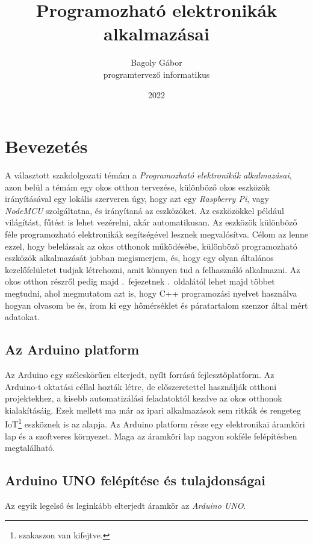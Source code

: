 \documentclass{thesis-ekf}
\theoremstyle{definition}
\begin{document}
\title{Programozható elektronikák alkalmazásai}
\author{Bagoly Gábor\\programtervező informatikus}
\date{2022}
\maketitle
\tableofcontents

\chapter{Bevezetés}\label{ArduinoChapter}

A választott szakdolgozati témám a \emph{Programozható elektronikák alkalmazásai}, azon belül a témám egy okos otthon tervezése, különböző okos eszközök irányításával egy lokális szerveren úgy, hogy azt egy \emph{Raspberry Pi}, vagy \emph{NodeMCU} szolgáltatna, és irányítaná az eszközöket.
Az eszközökkel például világítást, fűtést is lehet vezérelni, akár automatikusan. Az eszközök különböző féle programozható elektronikák segítségével lesznek megvalósítva. Célom az lenne ezzel, hogy belelássak az okos otthonok működésébe, különböző programozható eszközök alkalmazását jobban megismerjem, és, hogy egy olyan általános kezelőfelületet tudjak létrehozni, amit könnyen tud a felhasználó alkalmazni. Az okos otthon részről pedig majd .~fejezetnek \pageref{smarthomeChapter}.~oldalától lehet majd többet megtudni, ahol megmutatom azt is, hogy C++ programozási nyelvet használva hogyan olvasom be és, írom ki egy hőmérséklet és páratartalom szenzor által mért adatokat.

\section{Az Arduino platform}
	Az Arduino egy széleskörűen elterjedt, nyílt forrású fejlesztőplatform. Az Arduino-t oktatási céllal hozták létre, de előszeretettel használják otthoni projektekhez, a kisebb automatizálási feladatoktól kezdve az okos otthonok kialakításáig. Ezek mellett ma már az ipari alkalmazások sem ritkák és rengeteg IoT\footnote{ szakaszon van kifejtve.} eszköznek is az alapja.
	Az Arduino platform része egy elektronikai áramköri lap és a szoftveres környezet. Maga az áramköri lap nagyon sokféle felépítésben megtalálható.

\section{Arduino UNO felépítése és tulajdonságai}\label{arduinoUnoSection}
Az egyik legelső és leginkább elterjedt áramkör az \emph{Arduino UNO}.
\end{document}

